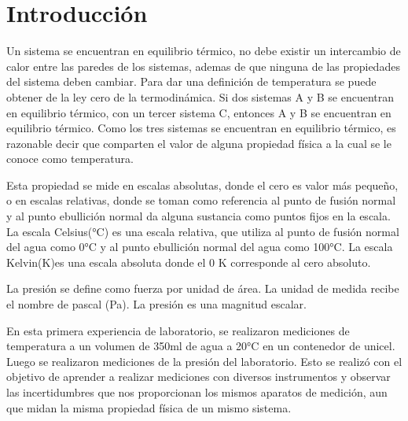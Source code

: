 \documentclass[12pt]{article}
\begin{document}
\section{Introducción}
Un sistema se encuentran en equilibrio térmico, no debe existir un intercambio de calor entre las paredes de los sistemas, ademas de que ninguna de las propiedades del sistema deben cambiar. Para dar una definición de temperatura se puede obtener de la ley cero de la termodinámica. Si dos sistemas A y B se encuentran en equilibrio térmico, con un tercer sistema C, entonces A y B se encuentran en equilibrio térmico. Como los tres sistemas se encuentran en equilibrio térmico, es razonable decir que comparten el valor de alguna propiedad física a la cual se le conoce como temperatura.

\hspace{0.75cm} Esta propiedad se mide en escalas absolutas, donde el cero es valor más pequeño, o en escalas relativas, donde se toman como referencia al punto de fusión normal y al punto ebullición normal da alguna sustancia como puntos fijos en la escala. La escala Celsius(°C) es una escala relativa, que utiliza al punto de fusión normal del agua como 0°C y al punto ebullición normal del agua como 100°C. La escala Kelvin(K)es una escala absoluta donde el 0 K corresponde al cero absoluto\cite{escala}.

\hspace{0.75cm} La presión se define como fuerza por unidad de área. La unidad de medida recibe el nombre de pascal (Pa). La presión es una magnitud escalar\cite{press}.

\hspace{0.75cm}En esta primera experiencia de laboratorio, se realizaron mediciones de temperatura a un volumen de 350ml de agua a 20°C en un contenedor de unicel. Luego se realizaron mediciones de la presión del laboratorio. Esto se realizó con el objetivo de aprender a realizar mediciones con diversos instrumentos y  observar las incertidumbres que nos proporcionan los mismos aparatos de medición, aun que midan la misma propiedad física de un mismo sistema.

\pagebreak
\end{document}
